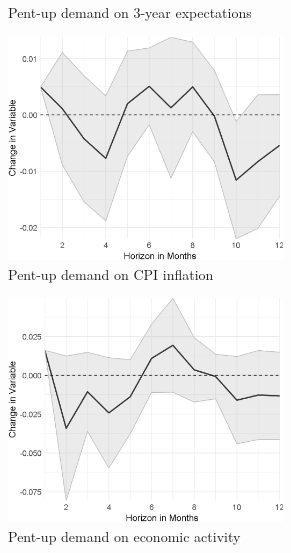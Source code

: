 \begin{figure}
\begin{subfigure}{00.24\textwidth}
		\caption{Pent-up demand on 3-year expectations}
	\end{subfigure}
	\begin{subfigure}{00.24\textwidth}
		\includegraphics[width=0.8\textwidth]{output/lp/baseline/bHP/pent_up_demand/pent_up_demandoninflation_djn.eps}
		\caption{Pent-up demand on CPI inflation}
	\end{subfigure}
	\begin{subfigure}{00.24\textwidth}
		\includegraphics[width=0.8\textwidth]{output/lp/baseline/bHP/pent_up_demand/pent_up_demandoneconac_djn.eps}
		\caption{Pent-up demand on economic activity}
	\end{subfigure}
	\begin{subfigure}{00.24\textwidth}

\end{subfigure}
\end{figure}
